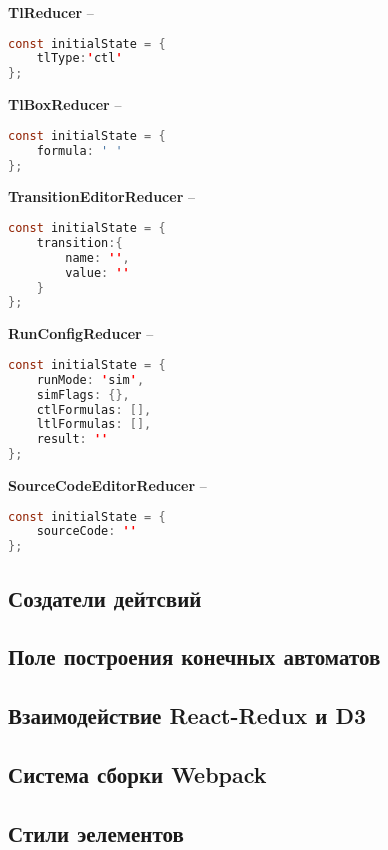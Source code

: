 \textbf{TlReducer} --

\begin{lstlisting}[language=Java,
caption={Инициализация состояния TlReducer.}]
const initialState = {
	tlType:'ctl'
};
\end{lstlisting}


\textbf{TlBoxReducer} --

\begin{lstlisting}[language=Java,
caption={Инициализация состояния TlBoxReducer.}]
const initialState = {
	formula: ' '
};
\end{lstlisting}


\textbf{TransitionEditorReducer} --

\begin{lstlisting}[language=Java,
caption={Инициализация состояния TransitionEditorReducer.}]
const initialState = {
	transition:{
		name: '',
		value: ''
	}
};
\end{lstlisting}


\textbf{RunConfigReducer} --

\begin{lstlisting}[language=Java,
caption={Инициализация состояния RunConfigReducer.}]
const initialState = {
	runMode: 'sim',
	simFlags: {},
	ctlFormulas: [],
	ltlFormulas: [],
	result: ''
};
\end{lstlisting}


\textbf{SourceCodeEditorReducer} --

\begin{lstlisting}[language=Java,
caption={Инициализация состояния SourceCodeEditorReducer.}]
const initialState = {
	sourceCode: ''
};
\end{lstlisting}


\subsection{Создатели дейтсвий}



\subsection{Поле построения конечных автоматов}



\subsection{Взаимодействие React-Redux и D3}



\subsection{Система сборки Webpack}



\subsection{Стили эелементов}











